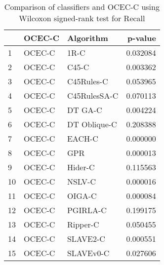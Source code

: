 \begin{table}
\footnotesize
\caption{Comparison of classifiers and OCEC-C using Wilcoxon signed-rank test for Recall}
\label{tab:OCEC-C wilcoxon Recall comparison}
\begin{tabular}{lllr}
\hline
 & OCEC-C & Algorithm & p-value \\
\hline
1 & OCEC-C & 1R-C & 0.032084 \\
2 & OCEC-C & C45-C & 0.003362 \\
3 & OCEC-C & C45Rules-C & 0.053965 \\
4 & OCEC-C & C45RulesSA-C & 0.070113 \\
5 & OCEC-C & DT GA-C & 0.004224 \\
6 & OCEC-C & DT Oblique-C & 0.208388 \\
7 & OCEC-C & EACH-C & 0.000000 \\
8 & OCEC-C & GPR & 0.000013 \\
9 & OCEC-C & Hider-C & 0.115563 \\
10 & OCEC-C & NSLV-C & 0.000016 \\
11 & OCEC-C & OIGA-C & 0.000084 \\
12 & OCEC-C & PGIRLA-C & 0.199175 \\
13 & OCEC-C & Ripper-C & 0.050455 \\
14 & OCEC-C & SLAVE2-C & 0.000551 \\
15 & OCEC-C & SLAVEv0-C & 0.027606 \\
\hline
\end{tabular}
\end{table}
